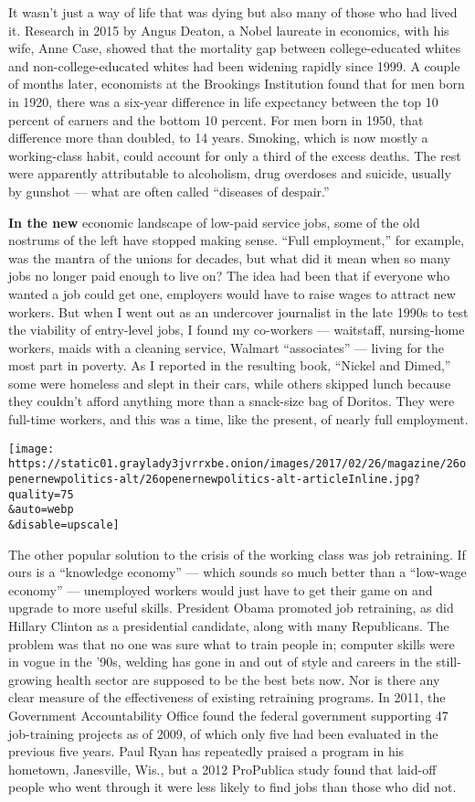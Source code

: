 It wasn't just a way of life that was dying but also many of those who
had lived it. Research in 2015 by Angus Deaton, a Nobel laureate in
economics, with his wife, Anne Case, showed that the mortality gap
between college-educated whites and non-college-educated whites had been
widening rapidly since 1999. A couple of months later, economists at the
Brookings Institution found that for men born in 1920, there was a
six-year difference in life expectancy between the top 10 percent of
earners and the bottom 10 percent. For men born in 1950, that difference
more than doubled, to 14 years. Smoking, which is now mostly a
working-class habit, could account for only a third of the excess
deaths. The rest were apparently attributable to alcoholism, drug
overdoses and suicide, usually by gunshot --- what are often called
``diseases of despair.''

\textbf{In the new} economic landscape of low-paid service jobs, some of
the old nostrums of the left have stopped making sense. ``Full
employment,'' for example, was the mantra of the unions for decades, but
what did it mean when so many jobs no longer paid enough to live on? The
idea had been that if everyone who wanted a job could get one, employers
would have to raise wages to attract new workers. But when I went out as
an undercover journalist in the late 1990s to test the viability of
entry-level jobs, I found my co-workers --- waitstaff, nursing-home
workers, maids with a cleaning service, Walmart ``associates'' ---
living for the most part in poverty. As I reported in the resulting
book, ``Nickel and Dimed,'' some were homeless and slept in their cars,
while others skipped lunch because they couldn't afford anything more
than a snack-size bag of Doritos. They were full-time workers, and this
was a time, like the present, of nearly full employment.

\texttt{[image: https://static01.graylady3jvrrxbe.onion/images/2017/02/26/magazine/26openernewpolitics-alt/26openernewpolitics-alt-articleInline.jpg?quality=75\\\&auto=webp\\\&disable=upscale]}

The other popular solution to the crisis of the working class was job
retraining. If ours is a ``knowledge economy'' --- which sounds so much
better than a ``low-wage economy'' --- unemployed workers would just
have to get their game on and upgrade to more useful skills. President
Obama promoted job retraining, as did Hillary Clinton as a presidential
candidate, along with many Republicans. The problem was that no one was
sure what to train people in; computer skills were in vogue in the '90s,
welding has gone in and out of style and careers in the still-growing
health sector are supposed to be the best bets now. Nor is there any
clear measure of the effectiveness of existing retraining programs. In
2011, the Government Accountability Office found the federal government
supporting 47 job-training projects as of 2009, of which only five had
been evaluated in the previous five years. Paul Ryan has repeatedly
praised a program in his hometown, Janesville, Wis., but a 2012
ProPublica study found that laid-off people who went through it were
less likely to find jobs than those who did not.

